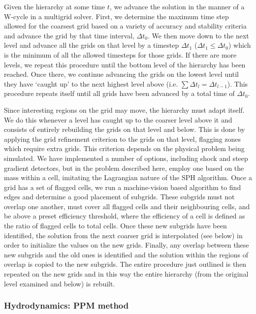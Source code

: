 Given the hierarchy at some time $t$, we advance the solution in the
manner of a W-cycle in a multigrid solver.  First, we determine the
maximum time step allowed for the coarsest grid based on a variety of
accuracy and stability criteria and advance the grid by that time
interval, $\Delta t_0$.  We then move down to the next level and
advance all the grids on that level by a timestep $\Delta t_1$
($\Delta t_1 \leq \Delta t_0$) which is the minimum of all the allowed
timesteps for those grids.  If there are more levels, we repeat this
procedure until the bottom level of the hierarchy has been reached.
Once there, we continue advancing the grids on the lowest level until
they have `caught up' to the next highest level above (i.e. $\sum
\Delta t_l = \Delta t_{l-1}$).  This procedure repeats itself until
all grids have been advanced by a total time of $\Delta t_0$.

Since interesting regions on the grid may move, the hierarchy must
adapt itself.  We do this whenever a level has caught up to the
coarser level above it and consists of entirely rebuilding the grids
on that level and below.  This is done by applying the grid refinement
criterion to the grids on that level, flagging zones which require
extra grids.  This criterion depends on the physical problem being
simulated.  We have implemented a number of options, including shock
and steep gradient detectors, but in the problem described here,
employ one based on the mass within a cell, imitating the Lagrangian
nature of the SPH algorithm.  Once a grid has a set of flagged cells,
we run a machine-vision based algorithm \citep{Berger91} to find edges
and determine a good placement of subgrids.  These subgrids must not
overlap one another, must cover all flagged cells and their
neighbouring cells, and be above a preset efficiency threshold, where
the efficiency of a cell is defined as the ratio of flagged cells to
total cells.  Once these new subgrids have been identified, the
solution from the next coarser grid is interpolated (see below) in
order to initialize the values on the new grids.  Finally, any overlap
between these new subgrids and the old ones is identified and the
solution within the regions of overlap is copied to the new subgrids.
The entire procedure just outlined is then repeated on the new grids
and in this way the entire hierarchy (from the original level examined
and below) is rebuilt.

\subsubsection{Hydrodynamics: PPM method}

